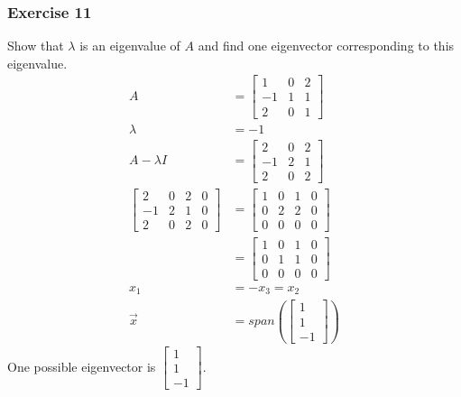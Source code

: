 \documentclass{math}
\begin{document}
\subsubsection*{Exercise 11}
Show that \( \lambda \) is an eigenvalue of \( A \) and find one eigenvector
corresponding to this eigenvalue.
\begin{align*}
  A &= \begin{bmatrix}
    1 & 0 & 2 \\
    -1 & 1 & 1 \\
    2 & 0 & 1
  \end{bmatrix} \\
  \lambda &= -1 \\
  A-\lambda I &= \begin{bmatrix}
    2 & 0 & 2 \\
    -1 & 2 & 1 \\
    2 & 0 & 2
  \end{bmatrix} \\
  \left[\begin{array}{ccc|c}
    2 & 0 & 2 & 0 \\
    -1 & 2 & 1 & 0 \\
    2 & 0 & 2 & 0
  \end{array}\right] &= \begin{bmatrix}
    1 & 0 & 1 & 0 \\
    0 & 2 & 2 & 0 \\
    0 & 0 & 0 & 0
  \end{bmatrix} \\
  &= \begin{bmatrix}
    1 & 0 & 1 & 0 \\
    0 & 1 & 1 & 0 \\
    0 & 0 & 0 & 0
  \end{bmatrix} \\
  x_1 &= -x_3 = x_2 \\
  \vec{x} &= span\left(\begin{bmatrix}1 \\ 1 \\ -1\end{bmatrix}\right)
\end{align*}
One possible eigenvector is \( \begin{bmatrix}1 \\ 1 \\ -1\end{bmatrix} \).
\end{document}
